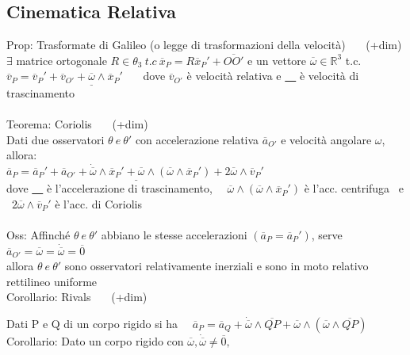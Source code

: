 \documentclass{article}
\theoremstyle{unnumbered}
\theoremstyle{unnumbered1}
\begin{document}
\subsection{Cinematica Relativa}
%
%
Prop: Trasformate di Galileo (o legge di trasformazioni della velocità) \ \ \ (+dim)\\
\phantom{\ } $\exists$ matrice ortogonale $R\in\theta_3 \ t.c \ \overline{x}_P = R\overline{x}_P' + \overline{OO'}$ e un vettore $\overline{\omega} \in \mathbb{R}^3$ t.c. \\
\phantom{\ } $\overline{v}_P = \overline{v}_P' + \underline{ \overline{v}_{O'} + \overline{\omega} \wedge \overline{x}_P'}$ \ \ \ dove $\overline{v}_{O'}$  è velocità relativa e \underline{ \ \ }  è velocità di trascinamento \\ \\
%
%
Teorema: Coriolis \ \ \ (+dim)\\
\phantom{\ } Dati due osservatori $\theta \ e \ \theta'$ con accelerazione relativa $\overline{a}_{O'}$ e velocità angolare $\omega$, allora: \\
\phantom{} \hspace{1in} $\overline{a}_P=\overline{a}_P' +  \underline{\overline{a}_{O'} + \dot{\overline{\omega}}\wedge\overline{x}_P' +  \overline{\omega}\wedge(\overline{\omega}\wedge\overline{x}_P')} +  2\overline{\omega}\wedge\overline{v}_P'$ \\
\phantom{\ } dove \underline{ \ \ } è l'accelerazione di trascinamento, \ \ $\overline{\omega}\wedge(\overline{\omega}\wedge\overline{x}_P')$ è l'acc. centrifuga \ e \ $2\overline{\omega}\wedge\overline{v}_P'$ è l'acc. di Coriolis \\ \\
%
%
%
Oss: Affinché $\theta \ e\ \theta'$ abbiano le stesse accelerazioni $(\overline{a}_P = \overline{a}_P')$,  serve \ $\overline{a}_{O'}=\overline{\omega}=\dot{\overline{\omega}}=\overline{0} $ \\
\phantom{Oss: }allora $\theta \ e\ \theta'$ sono osservatori relativamente inerziali e sono in moto relativo rettilineo uniforme \\
%
%
Corollario: Rivals \ \ \ (+dim)

Dati P e Q di un corpo rigido si ha \ \ $\overline{a}_P=\overline{a}_Q + \dot{\overline{\omega}}\wedge\overline{QP} +  \overline{\omega}\wedge(\overline{\omega}\wedge\overline{QP})$ \\
%
%
Corollario: Dato un corpo rigido con $\overline{\omega}, \dot{\overline{\omega}}\neq\overline{0},$
\end{document}
